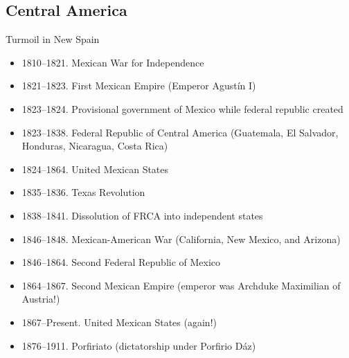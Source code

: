 \subsection{Central America}
\begin{frame}{Turmoil in New Spain}
	\begin{itemize}
		\item<1-12>1810--1821. Mexican War for Independence
		\item<2-12>1821--1823. First Mexican Empire (Emperor Agust{\'i}n I)
		\item<3-12>1823--1824. Provisional government of Mexico while federal republic created
		\item<4-12>1823--1838. Federal Republic of Central America (Guatemala, El Salvador, Honduras, Nicaragua, Costa Rica)
		\item<5-12>1824--1864. United Mexican States
		\item<6-12>1835--1836. Texas Revolution
		\item<7-12>1838--1841. Dissolution of FRCA into independent states
		\item<8-12>1846--1848. Mexican-American War (California, New Mexico, and Arizona)
		\item<9-12>1846--1864. Second Federal Republic of Mexico
		\item<10-12>1864--1867. Second Mexican Empire (emperor was Archduke Maximilian of Austria!)
		\item<11-12>1867--Present. United Mexican States (again!)
		\item<12>1876--1911. Porfiriato (dictatorship under Porfirio D{\'az})
	\end{itemize}
\end{frame}

